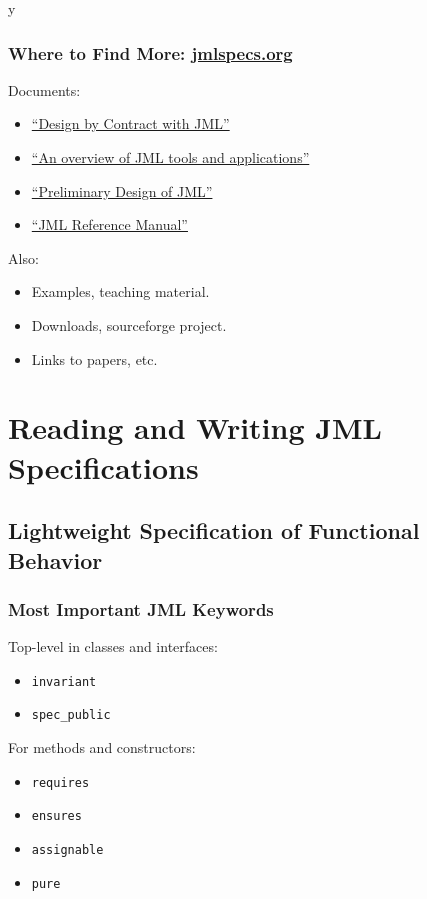 \if y\MAKEHANDOUTS \documentclass[compress,landscape,handout]{beamer}
\begin{document}
\begin{frame}
\frametitle{Where to Find More: \href{http://www.jmlspecs.org}{jmlspecs.org}}

Documents:
\begin{itemize}
\item
\href{ftp://ftp.cs.iastate.edu/pub/leavens/JML/jmldbc.pdf}{``Design by Contract with JML''}

\item
\href{http://dx.doi.org/10.1007/s10009-004-0167-4}{``An overview of JML tools and applications''}

\item
\href{http://doi.acm.org/10.1145/1127878.1127884}{``Preliminary Design of JML''}

\item
\href{http://www.jmlspecs.org/jmlrefman/jmlrefman_toc.html}{``JML Reference Manual''}
\end{itemize}

Also:
\begin{itemize}
\item
Examples, teaching material.

\item
Downloads, sourceforge project.

\item
Links to papers, etc.
\end{itemize}

\end{frame}

\section[Reading and Writing]{Reading and Writing JML Specifications}

\subsection[Lightweight]{Lightweight Specification of Functional Behavior}

\begin{frame}
\frametitle{Most Important JML Keywords}

Top-level in classes and interfaces:
\begin{itemize}
\item
\lstinline!invariant!

\item
\lstinline!spec_public!
\end{itemize}

For methods and constructors:
\begin{itemize}
\item
\lstinline!requires!

\item
\lstinline!ensures!

\item
\lstinline!assignable!

\item
\lstinline!pure!
\end{itemize}
\end{frame}
\end{document}
